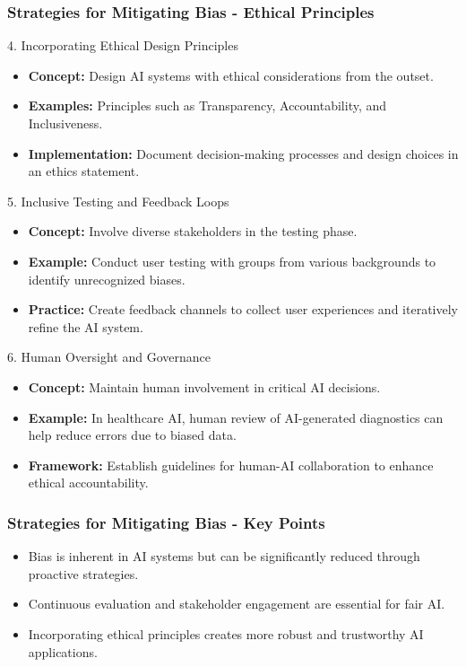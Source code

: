 \documentclass{beamer}
\begin{document}
\begin{frame}[fragile]
    \frametitle{Strategies for Mitigating Bias - Ethical Principles}
    \begin{block}{4. Incorporating Ethical Design Principles}
        \begin{itemize}
            \item \textbf{Concept:} Design AI systems with ethical considerations from the outset.
            \item \textbf{Examples:} Principles such as Transparency, Accountability, and Inclusiveness.
            \item \textbf{Implementation:} Document decision-making processes and design choices in an ethics statement.
        \end{itemize}
    \end{block}

    \begin{block}{5. Inclusive Testing and Feedback Loops}
        \begin{itemize}
            \item \textbf{Concept:} Involve diverse stakeholders in the testing phase.
            \item \textbf{Example:} Conduct user testing with groups from various backgrounds to identify unrecognized biases.
            \item \textbf{Practice:} Create feedback channels to collect user experiences and iteratively refine the AI system.
        \end{itemize}
    \end{block}

    \begin{block}{6. Human Oversight and Governance}
        \begin{itemize}
            \item \textbf{Concept:} Maintain human involvement in critical AI decisions.
            \item \textbf{Example:} In healthcare AI, human review of AI-generated diagnostics can help reduce errors due to biased data.
            \item \textbf{Framework:} Establish guidelines for human-AI collaboration to enhance ethical accountability.
        \end{itemize}
    \end{block}
\end{frame}

\begin{frame}[fragile]
    \frametitle{Strategies for Mitigating Bias - Key Points}
    \begin{itemize}
        \item Bias is inherent in AI systems but can be significantly reduced through proactive strategies.
        \item Continuous evaluation and stakeholder engagement are essential for fair AI.
        \item Incorporating ethical principles creates more robust and trustworthy AI applications.
    \end{itemize}
\end{frame}
\end{document}
